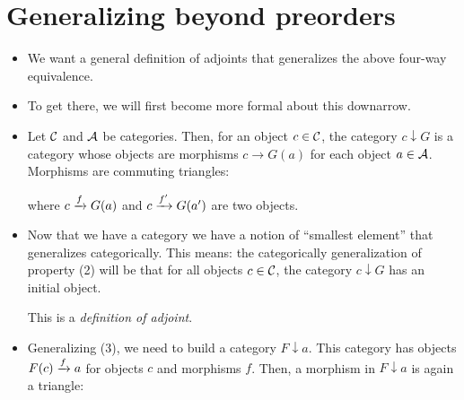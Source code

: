 \section{Generalizing beyond preorders}
\begin{itemize}
  \item We want a general definition of adjoints that generalizes the above 
  four-way equivalence. 
  \item To get there, we will first become more formal about 
  this downarrow.
  \item Let $\mathcal C$ and $\mathcal A$ be categories. 
  Then, for an object $c \in \mathcal C$, 
  the category $c \downarrow G$ is a category 
  whose objects are morphisms $c \to G(a)$ for each 
  object $a \in \mathcal A$.
  Morphisms are commuting triangles:

  \begin{center}
  \end{center}
  where $c \xrightarrow{f} G(a)$ and $c \xrightarrow{f'} G(a')$ are two 
  objects.


  \item Now that we have a category we have a notion of ``smallest 
  element'' that generalizes categorically. 
  This means: the categorically generalization of property (2) 
  will be that for all objects $c \in \mathcal C$, 
  the category $c \downarrow G$ has an initial object.

  This is a \emph{definition of adjoint}.
  


  \item Generalizing (3), we need to build a category $F \downarrow a$.
  This category has objects $F(c) \xrightarrow{f} a$ for 
  objects $c$ and morphisms $f$. 
  Then, a morphism in $F \downarrow a$ is again a triangle:

  \begin{center}
  \end{center}
  


\end{itemize}
